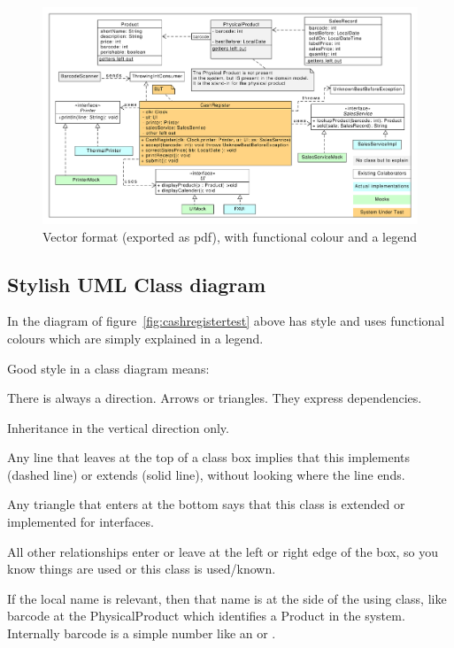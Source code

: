 \begin{figure}[htbp]
  \includegraphics[width=\linewidth]{images/perishablesales.pdf}
  \caption{\label{fig:cashregistertest}Vector format (exported as pdf), with functional colour and a legend}
\end{figure}


\subsection{Stylish UML Class diagram}
\label{sec:stylish}
In the diagram of figure~\vref{fig:cashregistertest} above has style and uses functional colours which are simply explained in a legend.

Good style in a class diagram means:
\begin{Itemize}
\item There is always a direction. Arrows or triangles. They express dependencies.
\item Inheritance in the vertical direction only.
  \begin{Itemize}
    \item Any line that leaves at the top of a class box implies that this
      implements (dashed line) or extends (solid line), without looking where the line ends.
    \item Any triangle that enters at the bottom says that this class is extended or implemented for interfaces.
  \end{Itemize}
  \item All other relationships enter or leave at the left or right edge of the box, so you know things are used
  or this class is used/known.
  \begin{Itemize}
  \item If the local name is relevant, then that name is at the side of the using class, like barcode at the PhysicalProduct which identifies a Product in the system. Internally barcode is a simple number like an  or .
  \end{Itemize}
\end{Itemize}

